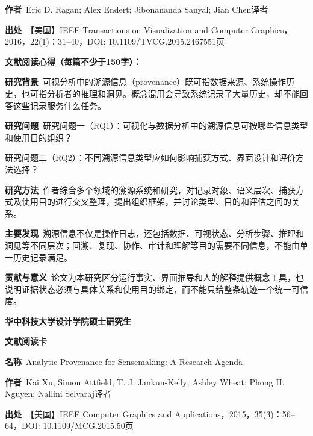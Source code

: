 \noindent\textbf{作者}\ Eric D. Ragan; Alex Endert; Jibonananda Sanyal; Jian Chen\quad 译者\par
\noindent\textbf{出处}\ 【美国】IEEE Transactions on Visualization and Computer Graphics，2016，22(1)：31–40，DOI: 10.1109/TVCG.2015.2467551\quad 页\par
\vspace{0.35em}
\noindent\textbf{文献阅读心得（每篇不少于150字）：}\par
\noindent\textbf{研究背景}\ 可视分析中的溯源信息（provenance）既可指数据来源、系统操作历史，也可指分析者的推理和洞见。概念混用会导致系统记录了大量历史，却不能回答这些记录服务什么任务。\par
\noindent\textbf{研究问题}\ 研究问题一（RQ1）：可视化与数据分析中的溯源信息可按哪些信息类型和使用目的组织？\par
研究问题二（RQ2）：不同溯源信息类型应如何影响捕获方式、界面设计和评价方法选择？\par
\noindent\textbf{研究方法}\ 作者综合多个领域的溯源系统和研究，对记录对象、语义层次、捕获方式及使用目的进行交叉整理，提出组织框架，并讨论类型、目的和评估之间的关系。\par
\noindent\textbf{主要发现}\ 溯源信息不仅是操作日志，还包括数据、可视状态、分析步骤、推理和洞见等不同层次；回溯、复现、协作、审计和理解等目的需要不同信息，不能由单一历史记录满足。\par
\noindent\textbf{贡献与意义}\ 论文为本研究区分运行事实、界面推导和人的解释提供概念工具，也说明证据状态必须与具体关系和使用目的绑定，而不能只给整条轨迹一个统一可信度。\par
\clearpage
\begin{center}
{\songti\bfseries\fontsize{18.5pt}{27.75pt}\selectfont 华中科技大学设计学院硕士研究生\par}
{\songti\bfseries\fontsize{18.5pt}{27.75pt}\selectfont 文献阅读卡\par}
\end{center}
\vspace{0.25em}
\noindent\underline{}\par
\vspace{0.35em}
\noindent\textbf{名称}\ Analytic Provenance for Sensemaking: A Research Agenda\par
\noindent\textbf{作者}\ Kai Xu; Simon Attfield; T. J. Jankun-Kelly; Ashley Wheat; Phong H. Nguyen; Nallini Selvaraj\quad 译者\par
\noindent\textbf{出处}\ 【美国】IEEE Computer Graphics and Applications，2015，35(3)：56–64，DOI: 10.1109/MCG.2015.50\quad 页\par
